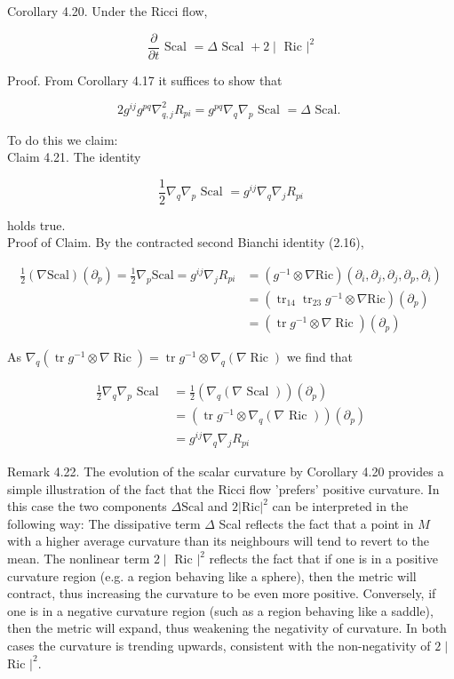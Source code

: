 \documentclass[10pt, letterpaper]{article}
\begin{document}
Corollary 4.20. Under the Ricci flow,

$$
\frac{\partial}{\partial t} \text { Scal }=\Delta \text { Scal }+2 \mid \text { Ric }\left.\right|^{2}
$$

Proof. From Corollary 4.17 it suffices to show that

$$
2 g^{i j} g^{p q} \nabla_{q, j}^{2} R_{p i}=g^{p q} \nabla_{q} \nabla_{p} \text { Scal }=\Delta \text { Scal. }
$$

To do this we claim:\\
Claim 4.21. The identity

$$
\frac{1}{2} \nabla_{q} \nabla_{p} \text { Scal }=g^{i j} \nabla_{q} \nabla_{j} R_{p i}
$$

holds true.\\
Proof of Claim. By the contracted second Bianchi identity (2.16),

$$
\begin{aligned}
\frac{1}{2}(\nabla \mathrm{Scal})\left(\partial_{p}\right)=\frac{1}{2} \nabla_{p} \mathrm{Scal}=g^{i j} \nabla_{j} R_{p i} & =\left(g^{-1} \otimes \nabla \mathrm{Ric}\right)\left(\partial_{i}, \partial_{j}, \partial_{j}, \partial_{p}, \partial_{i}\right) \\
& =\left(\operatorname{tr}_{14} \operatorname{tr}_{23} g^{-1} \otimes \nabla \mathrm{Ric}\right)\left(\partial_{p}\right) \\
& =\left(\operatorname{tr} g^{-1} \otimes \nabla \operatorname{Ric}\right)\left(\partial_{p}\right)
\end{aligned}
$$

As $\nabla_{q}\left(\operatorname{tr} g^{-1} \otimes \nabla \operatorname{Ric}\right)=\operatorname{tr} g^{-1} \otimes \nabla_{q}(\nabla \operatorname{Ric})$ we find that

$$
\begin{aligned}
\frac{1}{2} \nabla_{q} \nabla_{p} \text { Scal } & =\frac{1}{2}\left(\nabla_{q}(\nabla \text { Scal })\right)\left(\partial_{p}\right) \\
& =\left(\operatorname{tr} g^{-1} \otimes \nabla_{q}(\nabla \text { Ric })\right)\left(\partial_{p}\right) \\
& =g^{i j} \nabla_{q} \nabla_{j} R_{p i}
\end{aligned}
$$

Remark 4.22. The evolution of the scalar curvature by Corollary 4.20 provides a simple illustration of the fact that the Ricci flow 'prefers' positive curvature. In this case the two components $\Delta \mathrm{Scal}$ and $2|\mathrm{Ric}|^{2}$ can be interpreted in the following way: The dissipative term $\Delta$ Scal reflects the fact that a point in $M$ with a higher average curvature than its neighbours will tend to revert to the mean. The nonlinear term $2 \mid$ Ric $\left.\right|^{2}$ reflects the fact that if one is in a positive curvature region (e.g. a region behaving like a sphere), then the metric will contract, thus increasing the curvature to be even more positive. Conversely, if one is in a negative curvature region (such as a region behaving like a saddle), then the metric will expand, thus weakening the negativity of curvature. In both cases the curvature is trending upwards, consistent with the non-negativity of $2 \mid$ Ric $\left.\right|^{2}$.
\end{document}
